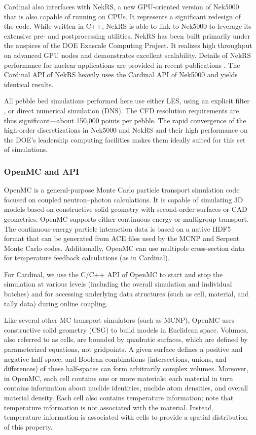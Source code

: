 Cardinal also interfaces with NekRS, a new GPU-oriented version of Nek5000
that is also capable of running on CPUs. It represents a significant redesign
of the code.  While written in C++, NekRS is able to link to Nek5000 to
leverage its extensive pre- and postprocessing utilities.  NekRS has been
built primarily under the auspices of the DOE Exascale Computing Project. It
realizes high throughput on advanced GPU nodes and demonstrates excellent
scalability.  Details of NekRS performance for nuclear applications are
provided in recent publications \cite{merzari2020toward}. The Cardinal API of
NekRS heavily uses the Cardinal API of Nek5000 and yields identical results.

All pebble bed simulations performed here use either LES, using an explicit
filter \cite{fischer2001filter}, or direct numerical simulation (DNS). The CFD
resolution requirements are thus significant---about 150,000 points per pebble.
The rapid convergence of the high-order discretizations in Nek5000 and NekRS
and their high performance on the DOE's leadership computing facilities makes
them ideally suited for this set of simulations.

\subsubsection{OpenMC and API}

OpenMC \cite{romano2015openmc} is a general-purpose Monte Carlo particle transport simulation code focused on coupled neutron--photon calculations. It is
capable of simulating 3D models based on constructive solid geometry with second-order surfaces or CAD geometries. OpenMC
supports either continuous-energy or multigroup transport. The continuous-energy particle interaction data
is based on a native HDF5 format that can be generated from ACE files used by the MCNP and Serpent
Monte Carlo codes. Additionally, OpenMC can use multipole cross-section data for temperature feedback
calculations (as in Cardinal).

For Cardinal, we use the C/C++ API of OpenMC to start and stop the simulation at various levels (including the overall
simulation and individual batches) and for accessing underlying data structures (such as cell, material, and
tally data) during online coupling.

Like several other MC transport simulators (such as MCNP), OpenMC uses constructive solid geometry (CSG) to build models in Euclidean space.
Volumes, also referred to as cells, are bounded by quadratic surfaces, which are defined by parameterized equations, not gridpoints. A given surface defines a positive and negative half-space, and Boolean combinations (intersections, unions, and differences) of these half-spaces can form arbitrarily complex volumes. Moreover, in OpenMC, each cell contains one or more materials; each material in turn contains information about nuclide identities, nuclide atom densities, and overall material density. Each cell also contains temperature information; note that temperature information is not associated with the material. Instead, temperature information is associated with cells to provide a spatial distribution of this property.

